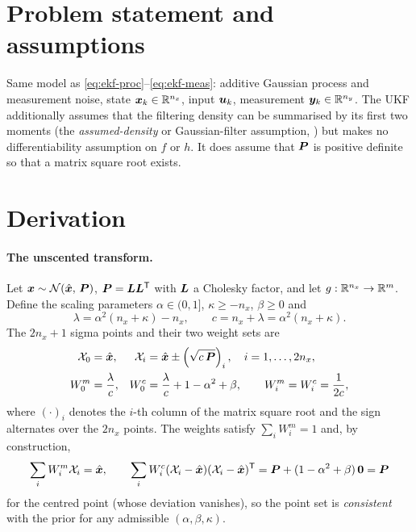 \section{Problem statement and assumptions}
Same model as \eqref{eq:ekf-proc}--\eqref{eq:ekf-meas}: additive Gaussian process and
measurement noise, state $\bm{x}_k\in\mathbb{R}^{n_x}$, input $\bm{u}_k$, measurement
$\bm{y}_k\in\mathbb{R}^{n_y}$. The UKF additionally assumes that the filtering density can be
summarised by its first two moments (the \emph{assumed-density} or Gaussian-filter
assumption, \cite{ito2000gaussian}) but makes no differentiability assumption on $f$ or $h$.
It does assume that $\bm{P}$ is positive definite so that a matrix square root exists.

\section{Derivation}
\paragraph{The unscented transform.} Let $\bm{x}\sim\mathcal{N}\!\left(\hat{\bm{x}},\,\bm{P}\right)$, $\bm{P} = \bm{L}\bm{L}^{\mathsf{T}}$ with
$\bm{L}$ a Cholesky factor, and let $g:\mathbb{R}^{n_x}\to\mathbb{R}^{m}$. Define the scaling parameters
$\alpha\in(0,1]$, $\kappa\ge -n_x$, $\beta\ge 0$ and
\begin{equation}
\lambda = \alpha^2 (n_x+\kappa) - n_x, \qquad c = n_x + \lambda = \alpha^2(n_x+\kappa).
\label{eq:ukf-lambda}
\end{equation}
The $2n_x+1$ sigma points and their two weight sets are
\begin{align}
\mathcal{X}_0 &= \hat{\bm{x}}, &
\mathcal{X}_i &= \hat{\bm{x}} \pm \left(\sqrt{c\,\bm{P}}\right)_{i}, \quad i = 1,\dots,2n_x,
\label{eq:ukf-sigma}\\
W_0^{m} &= \frac{\lambda}{c}, &
W_0^{c} &= \frac{\lambda}{c} + 1 - \alpha^2 + \beta, \qquad
W_i^{m} = W_i^{c} = \frac{1}{2c},
\label{eq:ukf-weights}
\end{align}
where $(\cdot)_i$ denotes the $i$-th column of the matrix square root and the sign alternates
over the $2n_x$ points. The weights satisfy $\sum_i W_i^m = 1$ and, by construction,
\begin{equation}
\sum_{i} W_i^m \mathcal{X}_i = \hat{\bm{x}}, \qquad
\sum_{i} W_i^c (\mathcal{X}_i - \hat{\bm{x}})(\mathcal{X}_i - \hat{\bm{x}})^{\mathsf{T}} = \bm{P} + (1-\alpha^2+\beta)\,\bm{0} = \bm{P}
\label{eq:ukf-consistency}
\end{equation}
for the centred point (whose deviation vanishes), so the point set is \emph{consistent} with
the prior for any admissible $(\alpha,\beta,\kappa)$.

